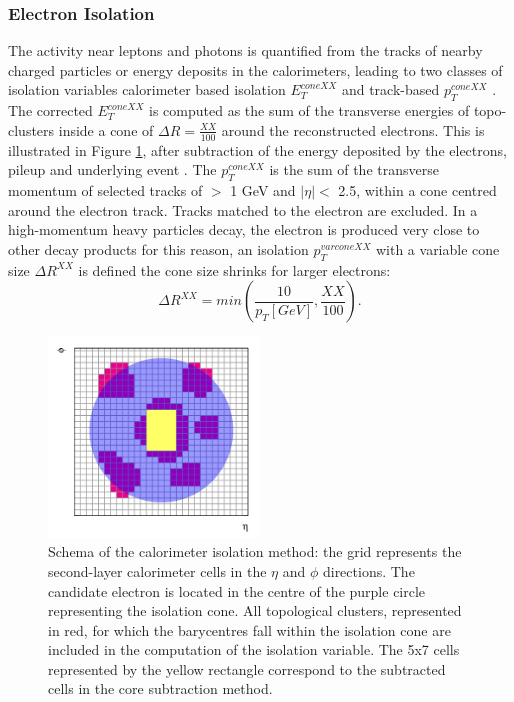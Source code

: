 \subsubsection{Electron Isolation}
\label{chap2:Objects:Egamma:EIso}
The activity near leptons and photons is quantified from the tracks of nearby charged particles or energy deposits in the calorimeters, leading to two classes of isolation variables calorimeter based isolation $E^{coneXX}_{T}$ and track-based $p_T^{coneXX}$ \cite{Electron_Reco_Id_Run1}. The corrected $E^{coneXX}_{T}$ is computed as the sum of the transverse energies of topo-clusters inside a cone of $\Delta R = \frac{XX}{100}$ around the reconstructed electrons. This is illustrated in Figure \ref{fig:chap2:Objects:Egamma:EIso:Schema}, after subtraction of the energy deposited by the electrons, pileup and underlying event \cite{PileUp_IsoExtract}. The $p_T^{coneXX}$ is the sum of the transverse momentum of selected tracks of \pT $>$ 1 GeV and $|\eta|<$ 2.5, within a cone centred around the electron track. Tracks matched to the electron are excluded. In a high-momentum heavy particles decay, the electron is produced very close to other decay products for this reason, an isolation $p_T^{varconeXX}$ with a variable cone size $\Delta R^{XX}$ is defined the cone size shrinks for larger \pT electrons:
\begin{equation}
    \Delta R^{XX} = min(\frac{10}{p_T[GeV]}, \frac{XX}{100}).
\end{equation}
\begin{figure}[htbp]
    \centering
    \includegraphics[width=0.5\textwidth]{Ch2/Img/Iso_Schema.png}
    \caption{Schema of the calorimeter isolation method: the grid represents the second-layer calorimeter cells in the $\eta$ and $\phi$ directions. The candidate electron is located in the centre of the purple circle representing the isolation cone. All topological clusters, represented in red, for which the barycentres fall within the isolation cone are included in the computation of the isolation variable. The 5x7 cells represented by the yellow rectangle correspond to the subtracted cells in the core subtraction method.}
    \label{fig:chap2:Objects:Egamma:EIso:Schema}
\end{figure}
